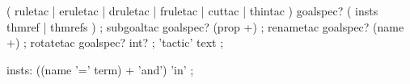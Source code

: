 








\begin{rail}
  ( ruletac | eruletac | druletac | fruletac | cuttac | thintac ) goalspec?
  ( insts thmref | thmrefs )
  ;
  subgoaltac goalspec? (prop +)
  ;
  renametac goalspec? (name +)
  ;
  rotatetac goalspec? int?
  ;
  'tactic' text
  ;

  insts: ((name '=' term) + 'and') 'in'
  ;
\end{rail}

